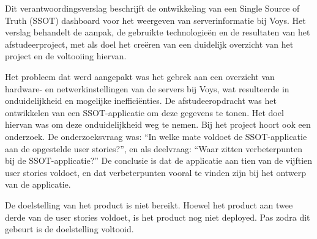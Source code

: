 \documentclass[../report.tex]{subfiles}
\begin{document}
Dit verantwoordingsverslag beschrijft de ontwikkeling van een Single Source of Truth (\gls*{SSOT}) dashboard voor het weergeven van serverinformatie bij Voys. Het verslag behandelt de aanpak, de gebruikte technologieën en de resultaten van het afstudeerproject, met als doel het creëren van een duidelijk overzicht van het project en de voltooiing hiervan.

Het probleem dat werd aangepakt was het gebrek aan een overzicht van hardware- en netwerkinstellingen van de servers bij Voys, wat resulteerde in onduidelijkheid en mogelijke inefficiënties. De afstudeeropdracht was het ontwikkelen van een SSOT-applicatie om deze gegevens te tonen. Het doel hiervan was om deze onduidelijkheid weg te nemen. Bij het project hoort ook een onderzoek. De onderzoeksvraag was: ``In welke mate voldoet de SSOT-applicatie aan de opgestelde user stories?'', en als deelvraag: ``Waar zitten verbeterpunten bij de SSOT-applicatie?'' De conclusie is dat de applicatie aan tien van de vijftien user stories voldoet, en dat verbeterpunten vooral te vinden zijn bij het ontwerp van de applicatie.

De doelstelling van het product is niet bereikt. Hoewel het product aan twee derde van de user stories voldoet, is het product nog niet deployed. Pas zodra dit gebeurt is de doelstelling voltooid.
\end{document}
